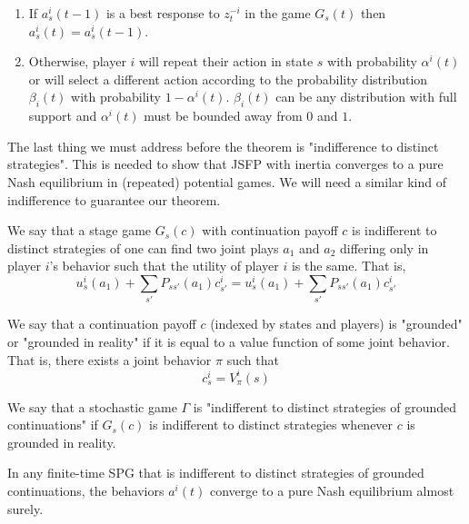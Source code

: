 \begin{enumerate}
\item If $a_s^i(t-1)$ is a best response to $z^{-i}_t$ in the game $G_s(t)$ then $a^i_s(t) = a^i_s(t-1)$.
\item Otherwise, player $i$ will repeat their action in state $s$ with probability $\alpha^i(t)$ or will select a different action according to the probability distribution $\beta_i(t)$ with probability $1 - \alpha^i(t)$. $\beta_i(t)$ can be any distribution with full support and $\alpha^i(t)$ must be bounded away from $0$ and $1$.
\end{enumerate}

The last thing we must address before the theorem is "indifference to distinct strategies". This is needed to show that JSFP with inertia converges to a pure Nash equilibrium in (repeated) potential games. We will need a similar kind of indifference to guarantee our theorem. 

\begin{mydef}
We say that a stage game $G_s(c)$ with continuation payoff $c$ is indifferent to distinct strategies of one can find two joint plays $a_1$ and $a_2$ differing only in player $i$'s behavior such that the utility of player $i$ is the same. That is,
$$
u^i_s(a_1) + \sum_{s'} P_{ss'}(a_1)c^i_{s'} = u^i_s(a_1) + \sum_{s'} P_{ss'}(a_1)c^i_{s'}
$$
\end{mydef}

\begin{mydef}
We say that a continuation payoff $c$ (indexed by states and players) is "grounded" or "grounded in reality" if it is equal to a value function of some joint behavior. That is, there exists a joint behavior $\pi$ such that
$$
c^i_s = V^i_{\pi}(s)
$$
\end{mydef}

\begin{mydef}
We say that a stochastic game $\Gamma$ is "indifferent to distinct strategies of grounded continuations" if $G_s(c)$ is indifferent to distinct strategies whenever $c$ is grounded in reality.
\end{mydef}

\begin{thm}
In any finite-time SPG that is indifferent to distinct strategies of grounded continuations, the behaviors $a^i(t)$ converge to a pure Nash equilibrium almost surely.
\end{thm}

